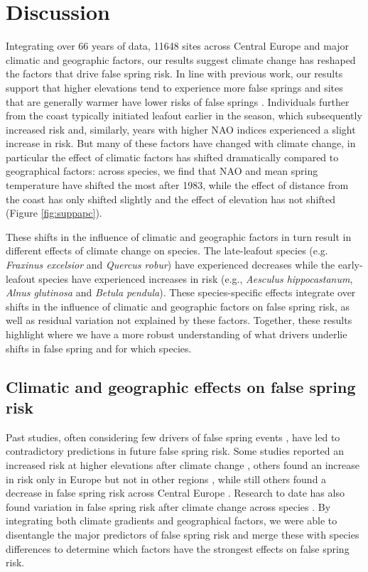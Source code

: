 \documentclass{article}\usepackage[]{graphicx}\usepackage[]{color}
\begin{document}
\section*{Discussion} %
Integrating over 66 years of data, 11648 sites across Central Europe and major climatic and geographic factors, our results suggest climate change has reshaped the factors that drive false spring risk. In line with previous work, our results support that higher elevations tend to experience more false springs \citep{Vitra2017,Vitasse2018} and sites that are generally warmer have lower risks of false springs \citep{Wypych2016}. Individuals further from the coast typically initiated leafout earlier in the season, which subsequently increased risk and, similarly, years with higher NAO indices experienced a slight increase in risk. But many of these factors have changed with climate change, in particular the effect of climatic factors has shifted dramatically compared to geographical factors: across species, we find that NAO and mean spring temperature have shifted the most after 1983, while the effect of distance from the coast has only shifted slightly and the effect of elevation has not shifted (Figure \ref{fig:suppapc}). 

These shifts in the influence of climatic and geographic factors in turn result in different effects of climate change on species. The late-leafout species (e.g. \textit{Fraxinus excelsior} and \textit{Quercus robur}) have experienced decreases while the early-leafout species have experienced increases in risk (e.g., \textit{Aesculus hippocastanum}, \textit{Alnus glutinosa} and \textit{Betula pendula}). These species-specific effects integrate over shifts in the influence of climatic and geographic factors on false spring risk, as well as residual variation not explained by these factors. Together, these results highlight where we have a more robust understanding of what drivers underlie shifts in false spring and for which species. %

\subsection*{Climatic and geographic effects on false spring risk}
Past studies, often considering few drivers of false spring events \citep{Wypych2016a,Liu2018, Ma2018, Vitasse2018}, have led to contradictory predictions in future false spring risk. Some studies reported an increased risk at higher elevations after climate change \citep{Vitasse2018}, others found an increase in risk only in Europe but not in other regions \citep{Liu2018}, while still others found a decrease in false spring risk across Central Europe \citep{Wypych2016a}. Research to date has also found variation in false spring risk after climate change across species \citep{Ma2018}. By integrating both climate gradients and geographical factors, we were able to disentangle the major predictors of false spring risk and merge these with species differences to determine which factors have the strongest effects on false spring risk. 
\end{document}

